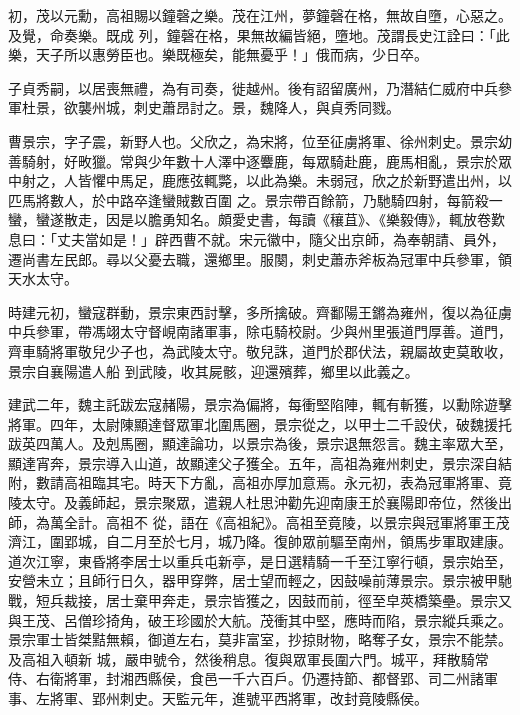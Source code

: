 \begin{pinyinscope}
 初，茂以元勳，高祖賜以鐘磬之樂。茂在江州，夢鐘磬在格，無故自墮，心惡之。及覺，命奏樂。既成
 列，鐘磬在格，果無故編皆絕，墮地。茂謂長史江詮曰：「此樂，天子所以惠勞臣也。樂既極矣，能無憂乎！」俄而病，少日卒。



 子貞秀嗣，以居喪無禮，為有司奏，徙越州。後有詔留廣州，乃潛結仁威府中兵參軍杜景，欲襲州城，刺史蕭昂討之。景，魏降人，與貞秀同戮。



 曹景宗，字子震，新野人也。父欣之，為宋將，位至征虜將軍、徐州刺史。景宗幼善騎射，好畋獵。常與少年數十人澤中逐麞鹿，每眾騎赴鹿，鹿馬相亂，景宗於眾中射之，人皆懼中馬足，鹿應弦輒斃，以此為樂。未弱冠，欣之於新野遣出州，以匹馬將數人，於中路卒逢蠻賊數百圍
 之。景宗帶百餘箭，乃馳騎四射，每箭殺一蠻，蠻遂散走，因是以膽勇知名。頗愛史書，每讀《穰苴》、《樂毅傳》，輒放卷歎息曰：「丈夫當如是！」辟西曹不就。宋元徽中，隨父出京師，為奉朝請、員外，遷尚書左民郎。尋以父憂去職，還鄉里。服闋，刺史蕭赤斧板為冠軍中兵參軍，領天水太守。



 時建元初，蠻寇群動，景宗東西討擊，多所擒破。齊鄱陽王鏘為雍州，復以為征虜中兵參軍，帶馮翊太守督峴南諸軍事，除屯騎校尉。少與州里張道門厚善。道門，齊車騎將軍敬兒少子也，為武陵太守。敬兒誅，道門於郡伏法，親屬故吏莫敢收，景宗自襄陽遣人船
 到武陵，收其屍骸，迎還殯葬，鄉里以此義之。



 建武二年，魏主託跋宏寇赭陽，景宗為偏將，每衝堅陷陣，輒有斬獲，以勳除遊擊將軍。四年，太尉陳顯達督眾軍北圍馬圈，景宗從之，以甲士二千設伏，破魏援托跋英四萬人。及剋馬圈，顯達論功，以景宗為後，景宗退無怨言。魏主率眾大至，顯達宵奔，景宗導入山道，故顯達父子獲全。五年，高祖為雍州刺史，景宗深自結附，數請高祖臨其宅。時天下方亂，高祖亦厚加意焉。永元初，表為冠軍將軍、竟陵太守。及義師起，景宗聚眾，遣親人杜思沖勸先迎南康王於襄陽即帝位，然後出師，為萬全計。高祖不
 從，語在《高祖紀》。高祖至竟陵，以景宗與冠軍將軍王茂濟江，圍郢城，自二月至於七月，城乃降。復帥眾前驅至南州，領馬步軍取建康。道次江寧，東昏將李居士以重兵屯新亭，是日選精騎一千至江寧行頓，景宗始至，安營未立；且師行日久，器甲穿弊，居士望而輕之，因鼓噪前薄景宗。景宗被甲馳戰，短兵裁接，居士棄甲奔走，景宗皆獲之，因鼓而前，徑至皁莢橋築壘。景宗又與王茂、呂僧珍掎角，破王珍國於大航。茂衝其中堅，應時而陷，景宗縱兵乘之。景宗軍士皆桀黠無賴，御道左右，莫非富室，抄掠財物，略奪子女，景宗不能禁。及高祖入頓新
 城，嚴申號令，然後稍息。復與眾軍長圍六門。城平，拜散騎常侍、右衛將軍，封湘西縣侯，食邑一千六百戶。仍遷持節、都督郢、司二州諸軍事、左將軍、郢州刺史。天監元年，進號平西將軍，改封竟陵縣侯。




\end{pinyinscope}
